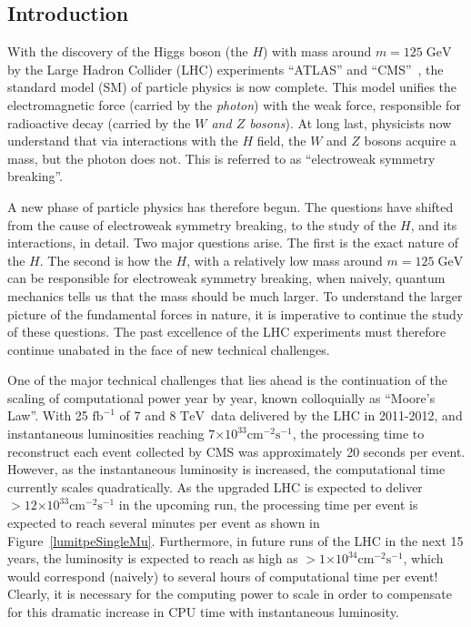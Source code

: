 \documentclass[12pt]{article}
\newcommand{\GeV}{\ensuremath{\mathrm{GeV}}}
\newcommand{\TeV}{\ensuremath{\mathrm{TeV}}}
\newcommand{\fbinv}        {\ensuremath{\mathrm{fb}^{-1}}}
\newcommand{\instlumiA}     {\ensuremath{\times 10^{33} \mathrm{cm}^{-2} \mathrm{s}^{-1}}}
\newcommand{\instlumiB}     {\ensuremath{\times 10^{34} \mathrm{cm}^{-2} \mathrm{s}^{-1}}}
\begin{document}
\bigskip



\clearpage

\subsection{Introduction}

With the discovery of the Higgs boson (the $H$) with mass around 
$m=125 \;\GeV$ by the Large Hadron Collider (LHC)
experiments ``ATLAS'' and ``CMS''~\cite{higgs_cms,higgs_atlas}, the
standard model (SM) of particle
physics is now complete. This model unifies the electromagnetic force
(carried by the {\em photon}) with the weak force, responsible for
radioactive decay (carried by the {\em $W$ and $Z$ bosons}).
At long last,
physicists now understand that via interactions with the $H$ field,
the $W$ and $Z$ bosons acquire a mass, but the photon does not. 
This is referred to as ``electroweak symmetry breaking''. 


A new phase of particle physics has therefore begun. 
The questions have shifted from the cause of electroweak symmetry
breaking, to the study of the $H$, and its interactions, in
detail. Two major questions arise. The first is the exact nature of
the $H$. The
second is how the $H$, with a relatively low mass around $m=125 \;\GeV$
can be responsible for electroweak symmetry breaking, when naively,
quantum mechanics tells us that the mass should be much larger. 
To understand the larger picture of the fundamental forces in nature,
it is imperative to continue the study of these questions. 
The past excellence of the LHC experiments must therefore continue
unabated in the face of new technical challenges. 


One of the major technical challenges that lies ahead is the
continuation of the scaling of computational power year by year, known
colloquially as ``Moore's Law''. 
With 25 $\fbinv$ of 7 and 8 \TeV\ data delivered by the LHC in
2011-2012, and instantaneous luminosities reaching
$7\instlumiA$, the processing
time to reconstruct each event collected by CMS was approximately 20
seconds per event. However, as the instantaneous luminosity is
increased, the computational time currently scales quadratically. As
the upgraded LHC is expected to deliver $>12\instlumiA$ in the
upcoming run, the processing time per event is expected to reach
several minutes per event as shown in
Figure~\ref{lumitpeSingleMu}. Furthermore, in future runs of the LHC
in the next 15 years, the luminosity is expected to reach as high as
$>1\instlumiB$, which would correspond (naively) to several hours of
computational time per event! Clearly, it is necessary for the
computing power to scale in order to compensate for this dramatic
increase in CPU time with instantaneous luminosity. 
\end{document}
